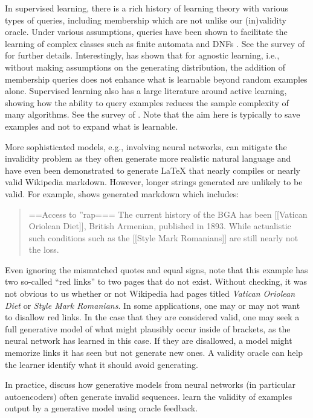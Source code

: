 In supervised learning, there is a rich history of learning theory with various types of queries, including membership which are not unlike our (in)validity oracle. Under various assumptions, queries have been shown to facilitate the learning of complex classes such as finite automata \citet{Angluin88} and DNFs \citet{Jackson97}. See the survey of \cite{Angluin92} for further details.  Interestingly, \cite{Feldman09} has shown that for agnostic learning, i.e., without making assumptions on the generating distribution, the addition of membership queries does not enhance what is learnable beyond random examples alone. 
Supervised learning also has a large literature around active learning, showing how the ability to query examples reduces the sample complexity of many algorithms. See the survey of \cite{Hanneke14}. Note that the aim here is typically to save examples and not to expand what is learnable.
 
More sophisticated models, e.g., involving neural networks, can mitigate the invalidity problem as they often generate more realistic natural language and have even been demonstrated to generate \LaTeX{} that nearly compiles \citep{Karpathy15} or nearly valid Wikipedia markdown. However, longer strings generated are unlikely to be valid. For example, \cite{Karpathy15} shows generated markdown which includes:
\begin{quote}
==Access to ''rap===
The current history of the BGA has been [[Vatican Oriolean Diet]], British Armenian, published in 1893.  While actualistic such conditions such as the [[Style Mark Romanians]] are still nearly not the loss.
\end{quote}

Even ignoring the mismatched quotes and equal signs, note that this example has two so-called ``red links'' to two pages that do not exist. Without checking, it was not obvious to us whether or not Wikipedia had pages titled {\em Vatican Oriolean Diet} or {\em Style Mark Romanians}. In some applications, one may or may not want to disallow red links. In the case that they are considered valid, one may seek a full generative model of what might plausibly occur inside of brackets, as the neural network has learned in this case. If they are disallowed, a model might memorize links it has seen but not generate new ones. A validity oracle can help the learner identify what it should avoid generating.

 In practice, \cite{KusnerPH17} discuss how generative models from neural networks (in particular autoencoders) often generate invalid sequences. 
\cite{JanzWPKH18} learn the validity of examples output by a generative model using oracle feedback. 
